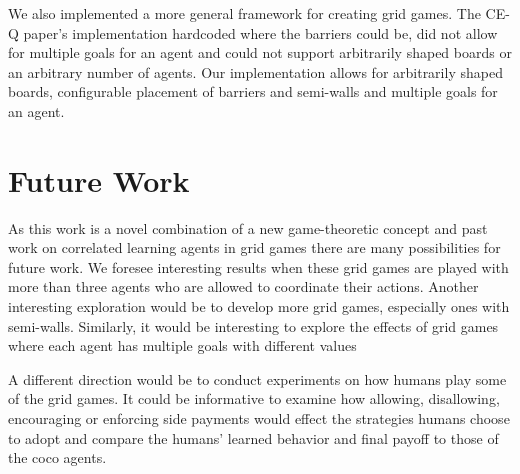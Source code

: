 We also implemented a more general framework for creating grid games. The CE-Q paper's implementation hardcoded where the barriers could be, did not allow for multiple goals for an agent and could not support arbitrarily shaped boards or an arbitrary number of agents. Our implementation allows for arbitrarily shaped boards, configurable placement of barriers and semi-walls and multiple goals for an agent.

\section{Future Work}
\hspace{5mm}As this work is a novel combination of a new game-theoretic concept and past work on correlated learning agents in grid games there are many possibilities for future work. We foresee interesting results when these grid games are played with more than three agents who are allowed to coordinate their actions. Another interesting exploration would be to develop more grid games, especially ones with semi-walls. Similarly, it would be interesting to explore the effects of grid games where each agent has multiple goals with different values

A different direction would be to conduct experiments on how humans play some of the grid games. It could be informative to examine how allowing, disallowing, encouraging or enforcing side payments would effect the strategies humans choose to adopt and compare the humans' learned behavior and final payoff to those of the coco agents.


